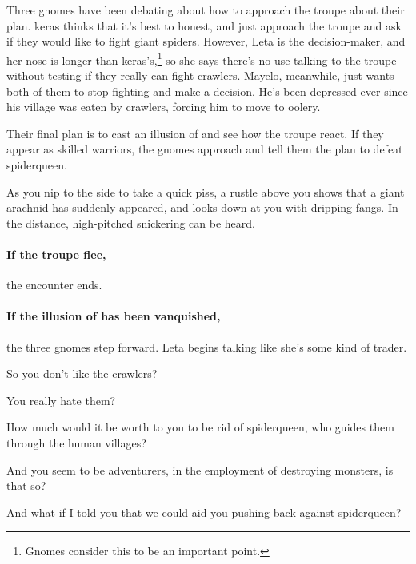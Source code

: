 \begin{exampletext}
  Three gnomes have been debating about how to approach the troupe about their plan.
  \Gls{keras} thinks that it's best to honest, and just approach the troupe and ask if they would like to fight giant spiders.
  However, Leta is the decision-maker, and her nose is longer than \gls{keras}'s,\footnote{Gnomes consider this to be an important point.} so she says there's no use talking to the troupe without testing if they really can fight \glspl{crawler}.
  Mayelo, meanwhile, just wants both of them to stop fighting and make a decision.
  He's been depressed ever since his \gls{village} was eaten by \glspl{crawler}, forcing him to move to \gls{oolery}.

  Their final plan is to cast an illusion of  and see how the troupe react.
  If they appear as skilled warriors, the gnomes approach and tell them the plan to defeat \gls{spiderqueen}.
\end{exampletext}

\begin{boxtext}
  As you nip to the side to take a quick piss, a rustle above you shows that a giant arachnid has suddenly appeared, and looks down at you with dripping fangs.
  In the distance, high-pitched snickering can be heard.
\end{boxtext}

\paragraph{If the troupe flee,}
the encounter ends.

\paragraph{If the illusion of  has been vanquished,}
the three gnomes step forward.
Leta begins talking like she's some kind of trader.

\begin{speechtext}
  So you don't like the \glspl{crawler}?

  You really hate them?

  How much would it be worth to you to be rid of \gls{spiderqueen}, who guides them through the human \glspl{village}?

  And you seem to be adventurers, in the employment of destroying monsters, is that so?

  And what if I told you that we could aid you pushing back against \gls{spiderqueen}?
\end{speechtext}

